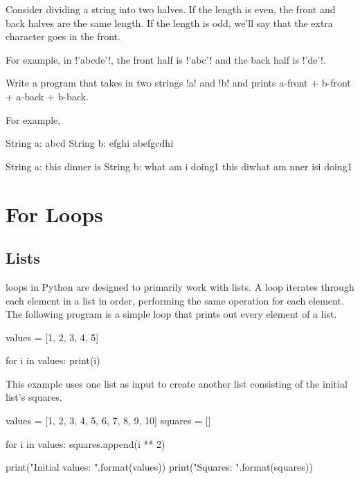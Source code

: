 \documentclass[11pt]{cselabheader}
\begin{document}
\begin{ex}[splitit.py] Consider dividing a string into two halves. If the length
  is even, the front and back halves are the same length. If the length is odd,
  we'll say that the extra character goes in the front. 

  For example, in \pythoninline!'abcde'!, the front half is \pythoninline!'abc'!
  and the back half is \pythoninline!'de'!. 

  Write a program that takes in two strings \pythoninline!a! and
  \pythoninline!b!  and prints a-front + b-front + a-back + b-back.

  For example,

  \begin{verbatimcode}
String a: abcd
String b: efghi
abefgcdhi
  \end{verbatimcode}

  \begin{verbatimcode}
String a: this dinner is
String b: what am i doing1
this diwhat am nner isi doing1
  \end{verbatimcode}

\end{ex}

\pagebreak
\section{For Loops}

\subsection{Lists}
 loops in Python are designed to primarily work with lists. A
 loop iterates through each element in a list in order,
performing the same operation for each element. The following program is a
simple  loop that prints out every element of a list.

\begin{python3code}
values = [1, 2, 3, 4, 5]

for i in values:
    print(i)
\end{python3code}

This example uses one list as input to create another list consisting of the
initial list's squares.

\begin{python3code}
values = [1, 2, 3, 4, 5, 6, 7, 8, 9, 10]
squares = []

for i in values:
    squares.append(i ** 2)

print("Initial values: {}".format(values))
print("Squares: {}".format(squares))
\end{python3code}
\end{document}
